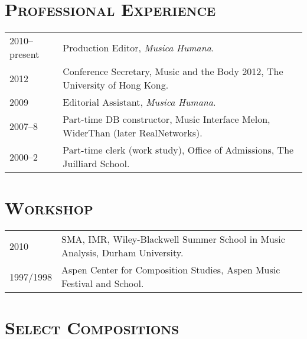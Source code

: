 \documentclass[a4paper,11pt,draft]{article}
\begin{document}
  \vspace{2.5mm}
  
  \section*{\textsc{Professional Experience}}
  
  \hspace*{-0.25cm}
  \begin{tabular}{p{2.5cm} l}
    2010--present & Production Editor, \textit{Musica Humana}.\\
    2012 & Conference Secretary, Music and the Body 2012, The University of Hong Kong.\\
    2009 & Editorial Assistant, \textit{Musica Humana}.\\
    2007--8 & Part-time DB constructor, Music Interface Melon, WiderThan (later RealNetworks).\\
    2000–2 & Part-time clerk (work study), Office of Admissions, The Juilliard School.
  \end{tabular}
  
  \vspace{2.5mm}
  
  \section*{\textsc{Workshop}}
  
  \hspace*{-0.25cm}
  \begin{tabular}{p{2.5cm} l}
    2010 & SMA, IMR, Wiley-Blackwell Summer School in Music Analysis, Durham University.\\
    1997/1998 & Aspen Center for Composition Studies, Aspen Music Festival and School.
  \end{tabular}
  
  \vspace{2.5mm}
  
  \section*{\textsc{Select Compositions}}
  
\end{document}

